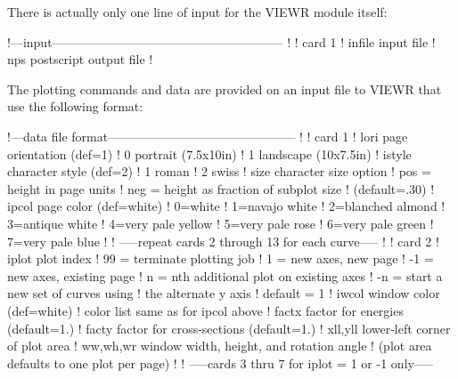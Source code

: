There is actually only one line of input for the VIEWR module itself:

\small
\begin{ccode}

   !---input--------------------------------------------------------
   !
   !  card 1
   !     infile        input file
   !     nps           postscript output file
   !

\end{ccode}
\normalsize

\noindent
The plotting commands and data are provided on an input file to VIEWR
that use the following format:

\small
\begin{ccode}

   !---data file format---------------------------------------------
   !
   !  card 1
   !     lori          page orientation (def=1)
   !                    0  portrait (7.5x10in)
   !                    1  landscape (10x7.5in)
   !     istyle        character style (def=2)
   !                     1  roman
   !                     2  swiss
   !     size          character size option
   !                     pos = height in page units
   !                     neg = height as fraction of subplot size
   !                       (default=.30)
   !     ipcol         page color (def=white)
   !                    0=white
   !                    1=navajo white
   !                    2=blanched almond
   !                    3=antique white
   !                    4=very pale yellow
   !                    5=very pale rose
   !                    6=very pale green
   !                    7=very pale blue
   !
   ! -----repeat cards 2 through 13 for each curve-----
   !
   !  card 2
   !     iplot         plot index
   !                     99 = terminate plotting job
   !                      1 = new axes, new page
   !                     -1 = new axes, existing page
   !                      n = nth additional plot on existing axes
   !                     -n = start a new set of curves using
   !                          the alternate y axis
   !                     default = 1
   !     iwcol         window color (def=white)
   !                    color list same as for ipcol above
   !     factx         factor for energies (default=1.)
   !     facty         factor for cross-sections (default=1.)
   !     xll,yll       lower-left corner of plot area
   !     ww,wh,wr      window width, height, and rotation angle
   !                   (plot area defaults to one plot per page)
   !
   ! -----cards 3 thru 7 for iplot = 1 or -1 only-----

\end{ccode}
